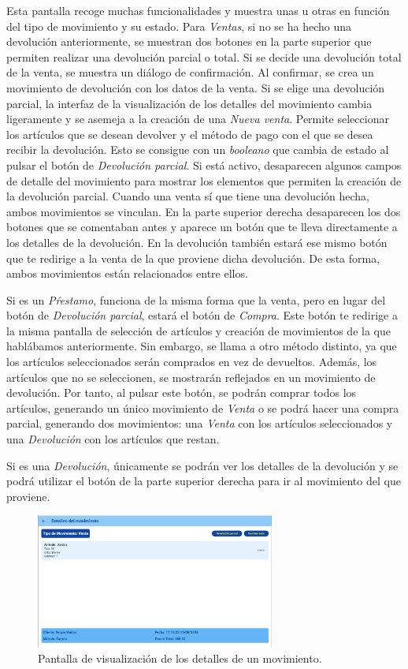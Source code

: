 Esta pantalla recoge muchas funcionalidades y muestra unas u otras en función del tipo de movimiento y su estado. Para \textit{Ventas}, si no se ha hecho una devolución anteriormente, se muestran dos botones en la parte superior que permiten realizar una devolución parcial o total. Si se decide una devolución total de la venta, se muestra un diálogo de confirmación. Al confirmar, se crea un movimiento de devolución con los datos de la venta. Si se elige una devolución parcial, la interfaz de la visualización de los detalles del movimiento cambia ligeramente y se asemeja a la creación de una \textit{Nueva venta}. Permite seleccionar los artículos que se desean devolver y el método de pago con el que se desea recibir la devolución. Esto se consigue con un \textit{booleano} que cambia de estado al pulsar el botón de \textit{Devolución parcial}. Si está activo, desaparecen algunos campos de detalle del movimiento para mostrar los elementos que permiten la creación de la devolución parcial. Cuando una venta sí que tiene una devolución hecha, ambos movimientos se vinculan. En la parte superior derecha desaparecen los dos botones que se comentaban antes y aparece un botón que te lleva directamente a los detalles de la devolución. En la devolución también estará ese mismo botón que te redirige a la venta de la que proviene dicha devolución. De esta forma, ambos movimientos están relacionados entre ellos. 

Si es un \textit{Pŕestamo}, funciona de la misma forma que la venta, pero en lugar del botón de \textit{Devolución parcial}, estará el botón de \textit{Compra}. Este botón te redirige a la misma pantalla de selección de artículos y creación de movimientos de la que hablábamos anteriormente. Sin embargo, se llama a otro método distinto, ya que los artículos seleccionados serán comprados en vez de devueltos. Además, los artículos que no se seleccionen, se mostrarán reflejados en un movimiento de devolución. Por tanto, al pulsar este botón, se podrán comprar todos los artículos, generando un único movimiento de \textit{Venta} o se podrá hacer una compra parcial, generando dos movimientos: una \textit{Venta} con los artículos seleccionados y una \textit{Devolución} con los artículos que restan. 

Si es una \textit{Devolución}, únicamente se podrán ver los detalles de la devolución y se podrá utilizar el botón de la parte superior derecha para ir al movimiento del que proviene. 

\begin{figure}[H]
	\centering
	\includegraphics[width=0.7\textwidth]{imagenes/TerceraIteracion/movementDetails.png}
	\caption{Pantalla de visualización de los detalles de un movimiento.}
\end{figure}

